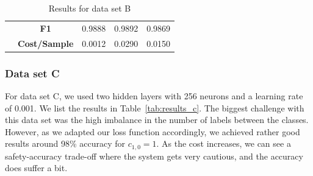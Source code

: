 \documentclass[acmsmall,nonacm]{acmart}
\begin{document}
\begin{table}[H]
{\begin{tabular}{cccllcllccc}
  \multicolumn{1}{|l|}{} & \multicolumn{1}{c|}{\textbf{F1}} & \multicolumn{3}{c|}{0.9888} & \multicolumn{3}{c|}{0.9892} & \multicolumn{3}{c|}{0.9869} \\ \cline{2-11} 
  \multicolumn{1}{|l|}{} & \multicolumn{1}{l|}{\textbf{Cost/Sample}} & \multicolumn{3}{c|}{0.0012} & \multicolumn{3}{c|}{0.0290} & \multicolumn{3}{c|}{0.0150} \\ \hline
  \end{tabular}}
  \caption{Results for data set B}
  \label{tab:results_b}
  \end{table}

\subsubsection*{Data set C}
For data set C, we used two hidden layers with 256 neurons and a learning rate of 0.001. We list the results in Table~\ref{tab:results_c}. The biggest challenge with this data set was the high imbalance in the number of labels between the classes. However, as we adapted our loss function accordingly, we achieved rather good results around 98\% accuracy for $c_{1, 0} = 1$. As the cost increases, we can see a safety-accuracy trade-off where the system gets very cautious, and the accuracy does suffer a bit.
\end{document}
